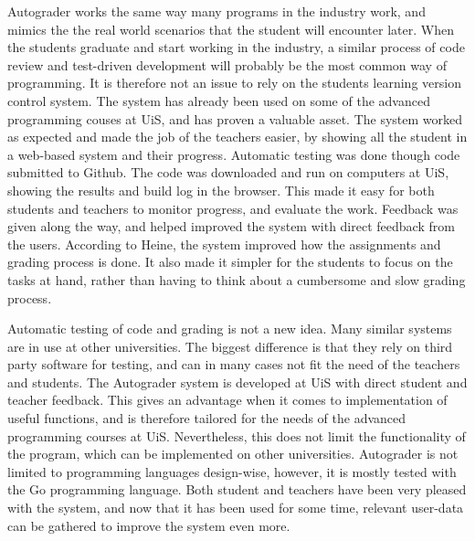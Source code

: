 \documentclass[12pt,a4paper]{report}
\begin{document}
Autograder works the same way many programs in the industry work, and mimics the the real world scenarios that the student will encounter later. When the students graduate and start working in the industry, a similar process of code review and test-driven development will probably be the most common way of programming. It is therefore not an issue to rely on the students learning version control system. The system has already been used on some of the advanced programming couses at UiS, and has proven a valuable asset. The system worked as expected and made the job of the teachers easier, by showing all the student in a web-based system and their progress. Automatic testing was done though code submitted to Github. The code was downloaded and run on computers at UiS, showing the results and build log in the browser. This made it easy for both students and teachers to monitor progress, and evaluate the work. Feedback was given along the way, and helped improved the system with direct feedback from the users. According to Heine, the system improved how the assignments and grading process is done. It also made it simpler for the students to focus on the tasks at hand, rather than having to think about a cumbersome and slow grading process.

Automatic testing of code and grading is not a new idea. Many similar systems are in use at other universities. The biggest difference is that they rely on third party software for testing, and can in many cases not fit the need of the teachers and students. The Autograder system is developed at UiS with direct student and teacher feedback. This gives an advantage when it comes to implementation of useful functions, and is therefore tailored for the needs of the advanced programming courses at UiS. Nevertheless, this does not limit the functionality of the program, which can be implemented on other universities. Autograder is not limited to programming languages design-wise, however, it is mostly tested with the Go programming language. Both student and teachers have been very pleased with the system, and now that it has been used for some time, relevant user-data can be gathered to improve the system even more.
\end{document}
